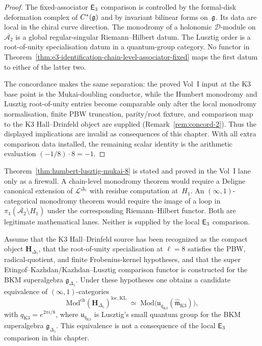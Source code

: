 \begin{proof}[Proof]
The fixed-associator $\mathsf{E}_3$ comparison is controlled by the
formal-disk deformation complex of $C^*(\mathfrak{g})$ and by invariant
bilinear forms on~$\mathfrak{g}$. Its data are local in the chiral curve
direction. The monodromy of a holonomic $\mathcal D$-module on
$\overline{\mathcal{A}_2}$ is a global regular-singular
Riemann--Hilbert datum. The Lusztig order is a root-of-unity
specialisation datum in a quantum-group category. No functor in
Theorem~\ref{thm:e3-identification-chain-level-associator-fixed}
maps the first datum to either of the latter two.

The concordance makes the same separation: the proved Vol~I input at
the K3 base point is the Mukai-doubling conductor, while the Humbert
monodromy and Lusztig root-of-unity entries become comparable only
after the local monodromy normalisation, finite PBW truncation,
parity/root fixture, and comparison map to the K3
Hall--Drinfeld object are supplied
(Remark~\ref{rem:concord-2}). Thus the displayed implications are
invalid as consequences of this chapter. With all extra comparison
data installed, the remaining scalar identity is the arithmetic
evaluation $(-1/8)\cdot 8=-1$.
\end{proof}

\begin{remark}
\label{rem:humbert-chain-vs-infty}
Theorem~\ref{thm:humbert-lusztig-mukai-8} is stated and proved in
the Vol~I lane only as a firewall. A chain-level monodromy theorem
would require a Deligne canonical extension of
$\mathcal L^{\Delta_5}$ with residue computation at~$H_1$. An
$(\infty,1)$-categorical monodromy theorem would require the image of
a loop in
$\pi_1(\overline{\mathcal{A}_2}\setminus H_1)$ under the corresponding
Riemann--Hilbert functor. Both are legitimate mathematical lanes.
Neither is supplied by the local $\mathsf{E}_3$ comparison.
\end{remark}

\begin{corollary}[Conditional Kazhdan--Lusztig target at
$q_{\mathrm{K3}} = e^{2\pi i/8}$]
\label{cor:kl-equivalence-k3-bkm}
\ClaimStatusConditional
{}
Assume that the K3 Hall--Drinfeld source has been recognized as the
compact object $\mathbf H_{\Delta_5}$, that the root-of-unity
specialisation at $\ell=8$ satisfies the PBW, radical-quotient, and
finite Frobenius-kernel hypotheses, and that the super
Etingof--Kazhdan/Kazhdan--Lusztig comparison functor is constructed
for the BKM superalgebra $\mathfrak g_{\Delta_5}$. Under these
hypotheses one obtains a candidate equivalence
of $(\infty,1)$-categories
\[
 \mathrm{Mod}^{\mathrm{ch}}(\mathbf{H}_{\Delta_5})^{\mathrm{loc,KL}}
 \;\simeq\;
 \mathrm{Mod}\bigl(\mathfrak{u}_{q_{\mathrm{K3}}}
 (\widehat{\mathfrak{m}}_{\mathrm{K3}})\bigr),
\]
with $q_{\mathrm{K3}} = e^{2\pi i / 8}$, where
$\mathfrak{u}_{q_{\mathrm{K3}}}$ is Lusztig's small quantum group for
the BKM superalgebra $\mathfrak{g}_{\Delta_5}$. This equivalence is
not a consequence of the local $\mathsf{E}_3$ comparison in this chapter.
\end{corollary}

